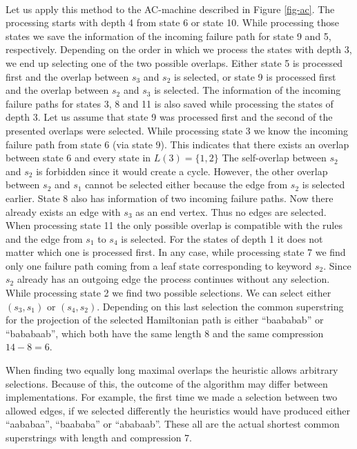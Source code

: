 \documentclass[english,twoside,censored,csm,algorithms-track-2020]{HYthesisML}
\theoremstyle{plain}
\theoremstyle{definition}
\begin{document}
\begin{testexample}~\label{examplelabeldummy}\\
Let us apply this method to the AC-machine described in Figure \ref{fig-ac}. The processing starts
with depth 4 from state 6 or state 10. While processing those states we save the information of
the incoming failure path for state 9 and 5, respectively. Depending on the order in which we process
the states with depth 3, we end up selecting one of the two possible overlaps. Either state 5
is processed first and the overlap between $s_3$ and $s_2$ is selected, or state 9 is processed
first and the overlap between $s_2$ and $s_3$ is selected. The information of the incoming failure
paths for states 3, 8 and 11 is also saved while processing the states of depth 3. Let us assume
that state 9 was processed first and the second of the presented overlaps were selected.
While processing state 3 we know the incoming failure path from state 6 (via
state 9). This indicates that there exists an overlap between state 6 and every state
in $L(3)=\{1,2\}$ The self-overlap between $s_2$ and $s_2$ is forbidden since it would
create a cycle. However, the other overlap between $s_2$ and $s_1$ cannot be selected either because
the edge from $s_2$ is selected earlier. State 8 also has information of two incoming failure
paths. Now there already exists an edge with $s_3$ as an end vertex. Thus no edges are selected.
When processing state 11 the only possible overlap is compatible with the rules and the edge
from $s_1$ to $s_4$ is selected. For the states of depth 1 it does not matter which one is processed
first. In any case, while processing state 7 we find only one failure path coming from a leaf state
corresponding to keyword $s_2$. Since $s_2$ already has an outgoing edge the process continues
without any selection. While processing state 2 we find two possible selections. We can select
either $(s_3,s_1)$ or $(s_4,s_2)$. Depending on this last selection the common superstring for
the projection of the selected Hamiltonian path is either ``baababab'' or ``bababaab'', which
both have the same length 8 and the same compression $14-8=6$.

When finding two equally long maximal overlaps the heuristic allows arbitrary selections.
Because of this, the outcome of the algorithm may differ between implementations. For example,
the first time
we made a selection between two allowed edges, if we selected differently the heuristics would
have produced either ``aababaa'', ``baababa'' or ``ababaab''. These all are the actual shortest common
superstrings with length and compression 7.
\end{testexample}
\end{document}
